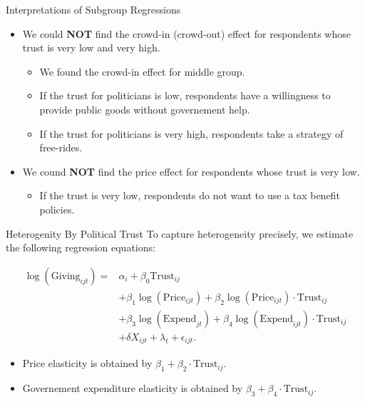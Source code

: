 \documentclass[
  ignorenonframetext,
]{beamer}
\providecommand{\tightlist}{%
  \setlength{\itemsep}{0pt}\setlength{\parskip}{0pt}}
\begin{document}
\begin{frame}{Interpretations of Subgroup Regressions}
\protect\hypertarget{interpretations-of-subgroup-regressions}{}
\begin{itemize}
\tightlist
\item
  We could \textbf{NOT} find the crowd-in (crowd-out) effect for
  respondents whose trust is very low and very high.

  \begin{itemize}
  \tightlist
  \item
    We found the crowd-in effect for middle group.
  \item
    If the trust for politicians is low, respondents have a willingness
    to provide public goods without governement help.
  \item
    If the trust for politicians is very high, respondents take a
    strategy of free-rides.
  \end{itemize}
\item
  We cound \textbf{NOT} find the price effect for respondents whose
  trust is very low.

  \begin{itemize}
  \tightlist
  \item
    If the trust is very low, respondents do not want to use a tax
    benefit policies.
  \end{itemize}
\end{itemize}
\end{frame}

\begin{frame}{Heterogenity By Political Trust}
\protect\hypertarget{heterogenity-by-political-trust}{}
To capture heterogeneity precisely, we estimate the following regression
equations:

\begin{align*}
    \log(\text{Giving}_{ijt}) = 
    &\alpha_i + \beta_0 \text{Trust}_{ij} \\
    &+ \beta_1 \log(\text{Price}_{ijt}) + \beta_2 \log(\text{Price}_{ijt})\cdot\text{Trust}_{ij} \\
    &+ \beta_3 \log(\text{Expend}_{jt}) + \beta_4 \log(\text{Expend}_{ijt})\cdot\text{Trust}_{ij}\\
    &+ \delta X_{ijt} + \lambda_t + \epsilon_{ijt}.
\end{align*}

\begin{itemize}
\tightlist
\item
  Price elasticity is obtained by
  \(\beta_1 + \beta_2\cdot\text{Trust}_{ij}\).
\item
  Governement expenditure elasticity is obtained by
  \(\beta_3 + \beta_4\cdot\text{Trust}_{ij}\).
\end{itemize}
\end{frame}
\end{document}
